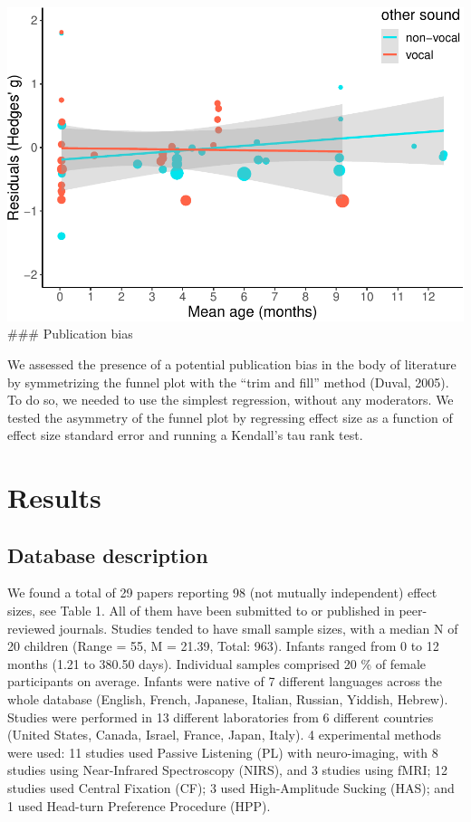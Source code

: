 \documentclass[]{apa6}
\begin{document}
\includegraphics{MA_speech_pref_files/figure-latex/residuals-1.pdf}
\#\#\# Publication bias

We assessed the presence of a potential publication bias in the body of
literature by symmetrizing the funnel plot with the \enquote{trim and
fill} method (Duval, 2005). To do so, we needed to use the simplest
regression, without any moderators. We tested the asymmetry of the
funnel plot by regressing effect size as a function of effect size
standard error and running a Kendall's tau rank test.

\section{Results}\label{results}

\subsection{Database description}\label{database-description}

We found a total of 29 papers reporting 98 (not mutually independent)
effect sizes, see Table 1. All of them have been submitted to or
published in peer-reviewed journals. Studies tended to have small sample
sizes, with a median N of 20 children (Range = 55, M = 21.39, Total:
963). Infants ranged from 0 to 12 months (1.21 to 380.50 days).
Individual samples comprised 20 \% of female participants on average.
Infants were native of 7 different languages across the whole database
(English, French, Japanese, Italian, Russian, Yiddish, Hebrew). Studies
were performed in 13 different laboratories from 6 different countries
(United States, Canada, Israel, France, Japan, Italy). 4 experimental
methods were used: 11 studies used Passive Listening (PL) with
neuro-imaging, with 8 studies using Near-Infrared Spectroscopy (NIRS),
and 3 studies using fMRI; 12 studies used Central Fixation (CF); 3 used
High-Amplitude Sucking (HAS); and 1 used Head-turn Preference Procedure
(HPP).
\end{document}
